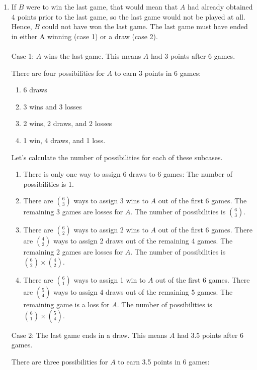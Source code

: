 \begin{enumerate}[label=(\alph*)]
  \item If $B$ were to win the last game, that would mean that $A$ had already 
  obtained $4$ points prior to the last game, so the last game would not be 
  played at all. Hence, $B$ could not have won the last game. 
  The last game must have ended in either A winning (case 1) or a draw (case 2).\\
    \\
    Case 1: $A$ wins the last game. This means $A$ had 3 points
    after 6 games. 
    
    There are four possibilities for $A$ to earn 3 points in 6 games:
  
    \begin{enumerate}[label=1.\arabic*.]
      \item 6 draws
      \item 3 wins and 3 losses
      \item 2 wins, 2 draws, and 2 losses
      \item 1 win, 4 draws, and 1 loss.
    \end{enumerate}
  
    Let's calculate the number of possibilities for each of these subcases.
  
    \begin{enumerate}[label=1.\arabic*.]
      \item There is only one way to assign 6 draws to 6 games: The number of possibilities is 1.
      \item There are ${6 \choose 3}$ ways to assign 3 wins to $A$ out of the first 6 games. The remaining 3 games are losses for $A$. The number of possibilities is ${6 \choose 3}$.
      \item There are ${6 \choose 2}$ ways to assign 2 wins to $A$ out of the first 6 games. There are ${4 \choose 2}$ ways to assign 2 draws out of the remaining 4 games. The remaining 2 games are losses for $A$. The number of possibilities is ${6 \choose 2} \times {4 \choose 2}$.
      \item There are ${6 \choose 1}$ ways to assign 1 win to $A$ out of the first 6 games. There are ${5 \choose 4}$ ways to assign 4 draws out of the remaining 5 games. The remaining game is a loss for $A$. The number of possibilities is ${6 \choose 1} \times {5 \choose 4}$.
    \end{enumerate}
  
    Case 2: The last game ends in a draw. This means $A$ had 3.5 points after 6 games. 
    
    There are three possibilities for $A$ to earn 3.5 points in 6 games:
  

\end{enumerate}
